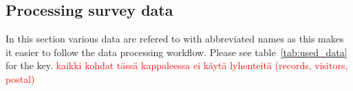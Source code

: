 \newpage
\subsection{Processing survey data}
\label{sec:processdata} %
\justify

In this section various data are refered to with abbreviated names as this makes it easier to follow the data processing workflow. Please see table~\ref{tab:used_data} for the key. \textcolor{red}{kaikki kohdat tässä kappaleessa ei käytä lyhenteitä (records, visitors, postal)}

